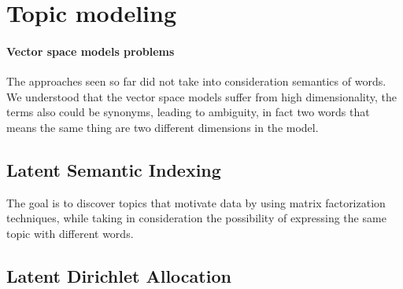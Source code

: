 \section{Topic modeling}

\paragraph{Vector space models problems}
The approaches seen so far did not take into 
consideration semantics of words. 
We understood that the vector space models suffer 
from high dimensionality, the terms also could be synonyms, 
leading to ambiguity, in fact two words that means 
the same thing are two different dimensions in the model.

\subsection{Latent Semantic Indexing}
The goal is to discover topics that motivate data
by using matrix factorization techniques, while 
taking in consideration the possibility of expressing
the same topic with different words.


\subsection{Latent Dirichlet Allocation}
